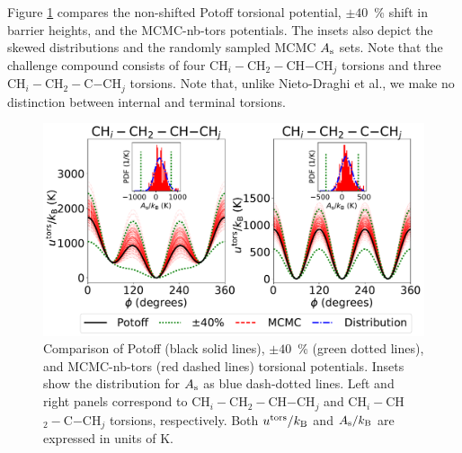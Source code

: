 \documentclass[preprint,review,12pt]{elsarticle}
\begin{document}
	
	Figure \ref{fig:dihedral_uncertainty} compares the non-shifted Potoff torsional potential, $\pm 40$~\% shift in barrier heights, and the MCMC-nb-tors potentials. The insets also depict the skewed distributions and the randomly sampled MCMC $A_{\rm s}$ sets. Note that the challenge compound consists of four CH$_i-$CH$_2-$CH$-$CH$_j$ torsions and three CH$_i-$CH$_2-$C$-$CH$_j$ torsions. Note that, unlike Nieto-Draghi et al., we make no distinction between internal and terminal torsions.
	
	
	
	\begin{figure}[htb!]
		\centering
		\includegraphics[width=6.4in]{MCMC_torsions.pdf}
		\caption{Comparison of Potoff (black solid lines), $\pm 40$~\% (green dotted lines), and MCMC-nb-tors (red dashed lines) torsional potentials. Insets show the distribution for $A_{\rm s}$ as blue dash-dotted lines. Left and right panels correspond to CH$_i-$CH$_2-$CH$-$CH$_j$ and CH$_i-$CH$_2-$C$-$CH$_j$ torsions, respectively. Both $u^{\rm tors}/k_{\rm B}$ and $A_{\rm s}/k_{\rm B}$ are expressed in units of K.}
		\label{fig:dihedral_uncertainty}
	\end{figure}
\end{document}

